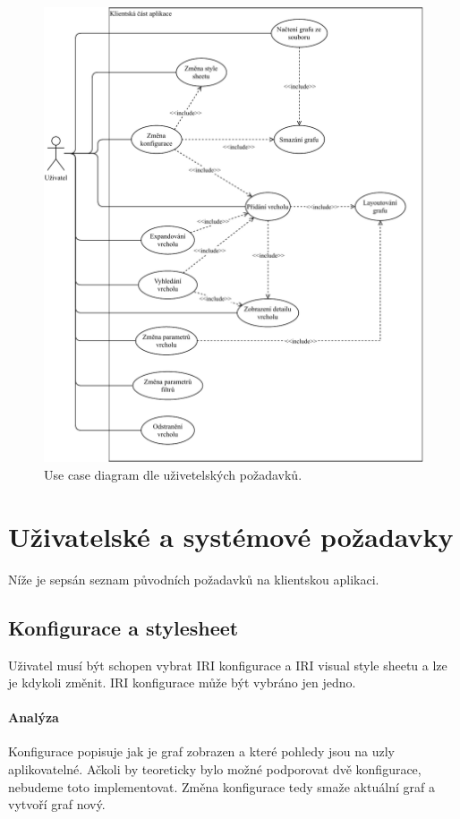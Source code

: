 \begin{figure}
    \centering
    \includegraphics[width=\textwidth]{media/use-case.pdf}
    \caption{Use case diagram dle uživetelských požadavků.}
    \label{fig:use-case}
\end{figure}

\section{Uživatelské a systémové požadavky}

Níže je sepsán seznam původních požadavků na klientskou aplikaci.

\subsection*{Konfigurace a stylesheet}
Uživatel musí být schopen vybrat IRI konfigurace a IRI visual style sheetu a lze je kdykoli změnit. IRI konfigurace může být vybráno jen jedno.

\paragraph{Analýza} Konfigurace popisuje jak je graf zobrazen a které pohledy jsou na uzly aplikovatelné. Ačkoli by teoreticky bylo možné podporovat dvě konfigurace, nebudeme toto implementovat. Změna konfigurace tedy smaže aktuální graf a vytvoří graf nový.

